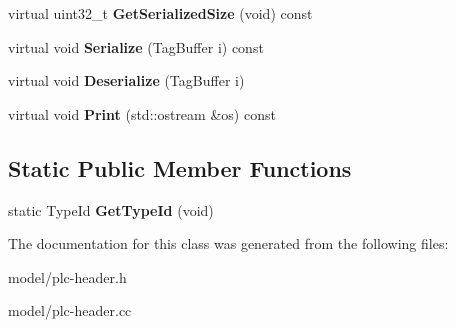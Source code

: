 \begin{DoxyCompactItemize}
\item 
\hypertarget{classns3_1_1PLC__PhyPacketTag_a32ef3f15cdae2c28ac6042a7de697b67}{virtual uint32\-\_\-t {\bfseries \-Get\-Serialized\-Size} (void) const }\label{classns3_1_1PLC__PhyPacketTag_a32ef3f15cdae2c28ac6042a7de697b67}

\item 
\hypertarget{classns3_1_1PLC__PhyPacketTag_a8ff0e437889399f2490b76d144d1664f}{virtual void {\bfseries \-Serialize} (\-Tag\-Buffer i) const }\label{classns3_1_1PLC__PhyPacketTag_a8ff0e437889399f2490b76d144d1664f}

\item 
\hypertarget{classns3_1_1PLC__PhyPacketTag_ae7424b79098d93f06aea526d242b42e2}{virtual void {\bfseries \-Deserialize} (\-Tag\-Buffer i)}\label{classns3_1_1PLC__PhyPacketTag_ae7424b79098d93f06aea526d242b42e2}

\item 
\hypertarget{classns3_1_1PLC__PhyPacketTag_a2f7bb901070912e27055a303ee07669a}{virtual void {\bfseries \-Print} (std\-::ostream \&os) const }\label{classns3_1_1PLC__PhyPacketTag_a2f7bb901070912e27055a303ee07669a}

\end{DoxyCompactItemize}
\subsection*{\-Static \-Public \-Member \-Functions}
\begin{DoxyCompactItemize}
\item 
\hypertarget{classns3_1_1PLC__PhyPacketTag_a3c48873dbf36614c3dddc651b8ec3e46}{static \-Type\-Id {\bfseries \-Get\-Type\-Id} (void)}\label{classns3_1_1PLC__PhyPacketTag_a3c48873dbf36614c3dddc651b8ec3e46}

\end{DoxyCompactItemize}


\-The documentation for this class was generated from the following files\-:\begin{DoxyCompactItemize}
\item 
model/plc-\/header.\-h\item 
model/plc-\/header.\-cc\end{DoxyCompactItemize}
